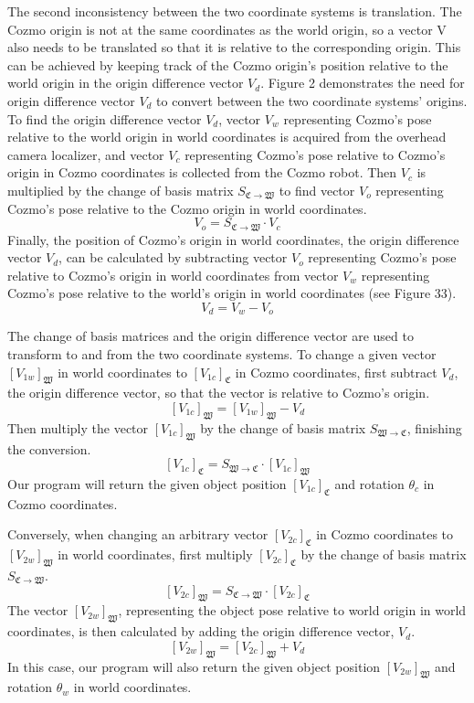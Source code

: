 \documentclass[jou,apacite]{apa6}
\begin{document}
The second inconsistency between the two coordinate systems is translation. The Cozmo origin is not at the same coordinates as the world origin, so a vector V also needs to be translated so that it is relative to the corresponding origin. This can be achieved by keeping track of the Cozmo origin's position relative to the world origin in the origin difference vector $V_d$. Figure 2 demonstrates the need for origin difference vector $V_d$ to convert between the two coordinate systems' origins. To find the origin difference vector $V_d$, vector $V_w$ representing Cozmo's pose relative to the world origin in world coordinates is acquired from the overhead camera localizer, and vector $V_c$ representing Cozmo's pose relative to Cozmo's origin in Cozmo coordinates is collected from the Cozmo robot. Then $V_c$ is multiplied by the change of basis matrix $S_{\mathfrak{C}\rightarrow\mathfrak{W}}$ to find vector $V_o$ representing Cozmo's pose relative to the Cozmo origin in world coordinates.
$$V_o = S_{\mathfrak{C}\rightarrow\mathfrak{W}} \cdot V_c$$
Finally, the position of Cozmo's origin in world coordinates, the origin difference vector $V_d$, can be calculated by subtracting vector $V_o$ representing Cozmo's pose relative to Cozmo's origin in world coordinates from vector $V_w$ representing Cozmo's pose relative to the world's origin in world coordinates (see Figure 33). 
$$V_d = V_w - V_o$$

The change of basis matrices and the origin difference vector are used to transform to and from the two coordinate systems. To change a given vector $[V_{1w}]_\mathfrak{W}$ in world coordinates to $[V_{1c}]_\mathfrak{C}$ in Cozmo coordinates, first subtract $V_d$, the origin difference vector, so that the vector is relative to Cozmo's origin.
$$[V_{1c}]_\mathfrak{W} =  [V_{1w}]_\mathfrak{W} - V_d$$
Then multiply the vector $[V_{1c}]_\mathfrak{W}$ by the change of basis matrix $S_{\mathfrak{W}\rightarrow\mathfrak{C}}$, finishing the conversion.
$$[V_{1c}]_\mathfrak{C} =  S_{\mathfrak{W}\rightarrow\mathfrak{C}} \cdot [V_{1c}]_\mathfrak{W}$$
Our program will return the given object position $[V_{1c}]_\mathfrak{C}$ and rotation $\theta_c$ in Cozmo coordinates.

Conversely, when changing an arbitrary vector $[V_{2c}]_\mathfrak{C}$ in Cozmo coordinates to $[V_{2w}]_\mathfrak{W}$ in world coordinates, first multiply $[V_{2c}]_\mathfrak{C}$ by the change of basis matrix $S_{\mathfrak{C}\rightarrow\mathfrak{W}}$.
$$[V_{2c}]_\mathfrak{W} = S_{\mathfrak{C}\rightarrow\mathfrak{W}} \cdot [V_{2c}]_\mathfrak{C}$$
The vector $[V_{2w}]_\mathfrak{W}$, representing the object pose relative to world origin in world coordinates, is then calculated by adding the origin difference vector, $V_d$.
$$[V_{2w}]_\mathfrak{W} = [V_{2c}]_\mathfrak{W}+ V_d$$
In this case, our program will also return the given object position $[V_{2w}]_\mathfrak{W}$ and rotation $\theta_w$ in world coordinates.
\end{document}
